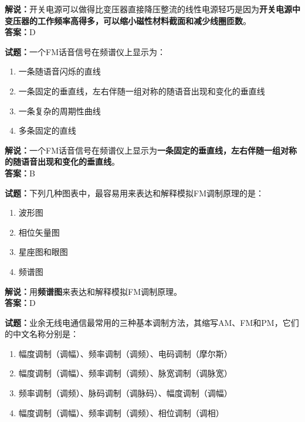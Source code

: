 \documentclass{ctexbook}
\begin{document}
\noindent\textbf{解说：}开关电源可以做得比变压器直接降压整流的线性电源轻巧是因为\textbf{开关电源中变压器的工作频率高得多，可以缩小磁性材料截面和减少线圈匝数}。\\\noindent\textbf{答案：}D%

\vspace{\baselineskip}

\noindent\textbf{试题：}一个FM话音信号在频谱仪上显示为：

\begin{enumerate}[leftmargin=3em]
  \item 一条随语音闪烁的直线
  \item 一条固定的垂直线，左右伴随一组对称的随语音出现和变化的垂直线
  \item 一条复杂的周期性曲线
  \item 多条固定的直线
\end{enumerate}

\noindent\textbf{解说：}一个FM话音信号在频谱仪上显示为\textbf{一条固定的垂直线，左右伴随一组对称的随语音出现和变化的垂直线}。\\\noindent\textbf{答案：}B%

\vspace{\baselineskip}

\noindent\textbf{试题：}下列几种图表中，最容易用来表达和解释模拟FM调制原理的是：

\begin{enumerate}[leftmargin=3em]
  \item 波形图
  \item 相位矢量图
  \item 星座图和眼图
  \item 频谱图
\end{enumerate}

\noindent\textbf{解说：}用\textbf{频谱图}来表达和解释模拟FM调制原理。\\\noindent\textbf{答案：}D%

\vspace{\baselineskip}

\noindent\textbf{试题：}业余无线电通信最常用的三种基本调制方法，其缩写AM、FM和PM，它们的中文名称分别是：

\begin{enumerate}[leftmargin=3em]
  \item 幅度调制（调幅）、频率调制（调频）、电码调制（摩尔斯）
  \item 幅度调制（调幅）、频率调制（调频）、脉宽调制（调脉宽）
  \item 频率调制（调频）、脉码调制（调脉码）、幅度调制（调幅）
  \item 幅度调制（调幅）、频率调制（调频）、相位调制（调相）
\end{enumerate}
\end{document}
